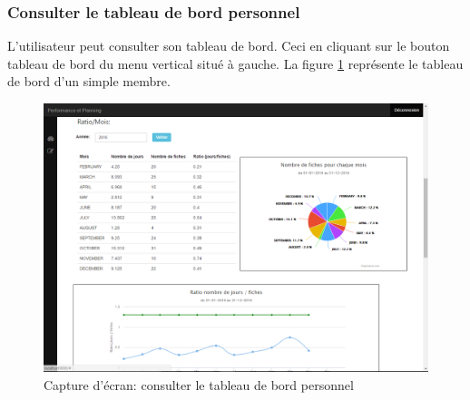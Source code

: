\subsubsection{Consulter le tableau de bord personnel}
L'utilisateur peut consulter son tableau de bord. Ceci en cliquant sur le bouton tableau de bord du menu vertical situé à gauche. La figure \ref{code95} représente le tableau de bord d'un simple membre.
\begin{figure}[H]
  \centering
 \includegraphics[scale=0.37]{figures/printscreen_app/11_2.PNG}
 \caption{Capture d'écran: consulter le tableau de bord personnel}
 \label{code95}
\end{figure}

